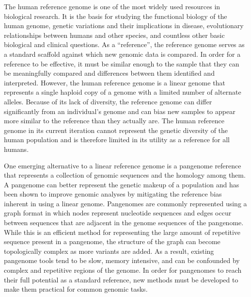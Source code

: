 \documentclass[11pt]{ucscthesis}
\begin{document}
The human reference genome is one of the most widely used resources in biological research.
It is the basis for studying the functional biology of the human genome, genetic variations and their implications in disease, evolutionary relationships between humans and other species, and countless other basic biological and clinical questions.
As a ``reference'', the reference genome serves as a standard scaffold against which new genomic data is compared.
In order for a reference to be effective, it must be similar enough to the sample that they can be meaningfully compared and differences between them identified and interpreted.
However, the human reference genome is a linear genome that represents a single haploid copy of a genome with a limited number of alternate alleles.
Because of its lack of diversity, the reference genome can differ significantly from an individual's genome and can bias new samples to appear more similar to the reference than they actually are.
The human reference genome in its current iteration cannot represent the genetic diversity of the human population and is therefore limited in its utility as a reference for all humans.

One emerging alternative to a linear reference genome is a pangenome reference that represents a collection of genomic sequences and the homology among them.
A pangenome can better represent the genetic makeup of a population and has been shown to improve genomic analyses by mitigating the reference bias inherent in using a linear genome.
Pangenomes are commonly represented using a graph format in which nodes represent nucleotide sequences and edges occur between sequences that are adjacent in the genome sequences of the pangenome.
While this is an efficient method for representing the large amount of repetitive sequence present in a pangenome, the structure of the graph can become topologically complex as more variants are added.
As a result, existing pangenome tools tend to be slow, memory intensive, and can be confounded by complex and repetitive regions of the genome.
In order for pangenomes to reach their full potential as a standard reference, new methods must be developed to make them practical for common genomic tasks.
\end{document}
